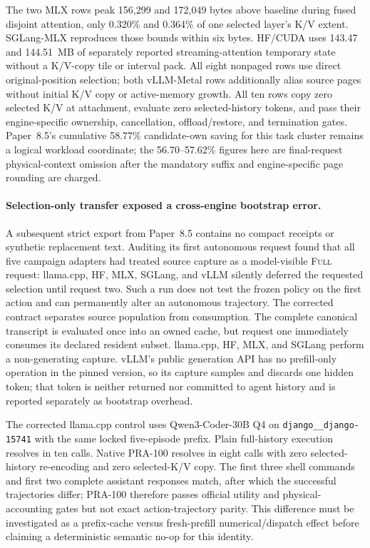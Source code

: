 \documentclass[11pt]{article}
\begin{document}
The two MLX rows peak 156,299 and 172,049 bytes above baseline during fused
disjoint attention, only 0.320\% and 0.364\% of one selected layer's K/V
extent.  SGLang-MLX reproduces those bounds within six bytes.  HF/CUDA uses
143.47 and 144.51~MB of separately reported streaming-attention temporary
state without a K/V-copy tile or interval pack.  All eight nonpaged rows
use direct original-position selection; both vLLM-Metal rows additionally alias
source pages without initial K/V copy or active-memory growth.  All ten rows
copy zero selected K/V at attachment, evaluate zero selected-history tokens,
and pass their engine-specific ownership, cancellation, offload/restore, and
termination gates.  Paper~8.5's cumulative 58.77\% candidate-own saving for
this task cluster remains a logical workload coordinate; the 56.70--57.62\%
figures here are final-request physical-context omission after the mandatory
suffix and engine-specific page rounding are charged.

\paragraph{Selection-only transfer exposed a cross-engine bootstrap error.}
A subsequent strict export from Paper~8.5 contains no compact receipts or
synthetic replacement text.  Auditing its first autonomous request found that
all five campaign adapters had treated source capture as a model-visible
\textsc{Full} request: llama.cpp, HF, MLX, SGLang, and vLLM silently deferred
the requested selection until request two.  Such a run does not test the
frozen policy on the first action and can permanently alter an autonomous
trajectory.  The corrected contract separates source population from
consumption.  The complete canonical transcript is evaluated once into an
owned cache, but request one immediately consumes its declared resident
subset.  llama.cpp, HF, MLX, and SGLang perform a non-generating capture.
vLLM's public generation API has no prefill-only operation in the pinned
version, so its capture samples and discards one hidden token; that token is
neither returned nor committed to agent history and is reported separately as
bootstrap overhead.

The corrected llama.cpp control uses Qwen3-Coder-30B Q4 on
\texttt{django\_\_django-15741} with the same locked five-episode prefix.
Plain full-history execution resolves in ten calls.  Native PRA-100 resolves
in eight calls with zero selected-history re-encoding and zero selected-K/V
copy.  The first three shell commands and first two complete assistant
responses match, after which the successful trajectories differ; PRA-100
therefore passes official utility and physical-accounting gates but not exact
action-trajectory parity.  This difference must be investigated as a
prefix-cache versus fresh-prefill numerical/dispatch effect before claiming a
deterministic semantic no-op for this identity.
\end{document}
